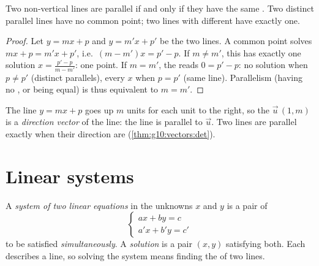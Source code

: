 \begin{proposition}\label{prop:g10:lines:parallel}
Two non-vertical lines are parallel if and only if they have the same
. Two distinct parallel lines have no common point; two lines with
different  have exactly one.
\end{proposition}

\begin{proof}
Let $y = mx + p$ and $y = m'x + p'$ be the two lines. A common point
solves $mx + p = m'x + p'$, i.e.\ $(m - m')x = p' - p$. If $m \neq m'$,
this has exactly one solution $x = \frac{p' - p}{m - m'}$: one
 point. If $m = m'$, the  reads $0 = p' - p$: no
solution when $p \neq p'$ (distinct parallels), every $x$ when $p = p'$
(same line). Parallelism (having no , or being equal) is thus
equivalent to $m = m'$.
\end{proof}

\begin{remark}
The line $y = mx + p$ goes up $m$ units for each unit to the right, so the
 $\vec u\,(1, m)$ is a \emph{direction
vector} of the line: the line is parallel to
$\vec u$. Two lines are parallel exactly when their direction  are
 (\cref{thm:g10:vectors:det}).
\end{remark}

\section{Linear systems}

\begin{definition}\label{def:g10:lines:system}
A \emph{system of two linear equations} in the
unknowns $x$ and $y$ is a pair of 
\[
\begin{cases}
a x + b y = c \\
a' x + b' y = c'
\end{cases}
\]
to be satisfied \emph{simultaneously}. A \emph{solution} is a pair
$(x, y)$ satisfying both. Each  describes a line, so solving the
system means finding the  of two lines.
\end{definition}


